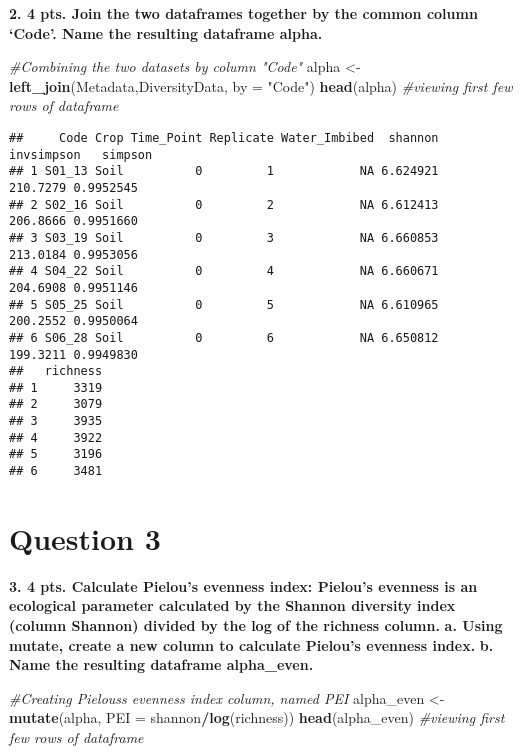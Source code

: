 \documentclass[
]{article}
\newenvironment{Shaded}{\begin{snugshade}}{\end{snugshade}}
\newcommand{\AttributeTok}[1]{\textcolor[rgb]{0.13,0.29,0.53}{#1}}
\newcommand{\CommentTok}[1]{\textcolor[rgb]{0.56,0.35,0.01}{\textit{#1}}}
\newcommand{\FunctionTok}[1]{\textcolor[rgb]{0.13,0.29,0.53}{\textbf{#1}}}
\newcommand{\NormalTok}[1]{#1}
\newcommand{\OtherTok}[1]{\textcolor[rgb]{0.56,0.35,0.01}{#1}}
\newcommand{\SpecialCharTok}[1]{\textcolor[rgb]{0.81,0.36,0.00}{\textbf{#1}}}
\newcommand{\StringTok}[1]{\textcolor[rgb]{0.31,0.60,0.02}{#1}}
\begin{document}
\textbf{2. 4 pts. Join the two dataframes together by the common column
`Code'. Name the resulting dataframe alpha.}

\begin{Shaded}
\begin{Highlighting}[]
\CommentTok{\#Combining the two datasets by column "Code"}
\NormalTok{alpha }\OtherTok{\textless{}{-}} \FunctionTok{left\_join}\NormalTok{(Metadata,DiversityData, }\AttributeTok{by =} \StringTok{"Code"}\NormalTok{)}
\FunctionTok{head}\NormalTok{(alpha) }\CommentTok{\#viewing first few rows of dataframe}
\end{Highlighting}
\end{Shaded}

\begin{verbatim}
##     Code Crop Time_Point Replicate Water_Imbibed  shannon invsimpson   simpson
## 1 S01_13 Soil          0         1            NA 6.624921   210.7279 0.9952545
## 2 S02_16 Soil          0         2            NA 6.612413   206.8666 0.9951660
## 3 S03_19 Soil          0         3            NA 6.660853   213.0184 0.9953056
## 4 S04_22 Soil          0         4            NA 6.660671   204.6908 0.9951146
## 5 S05_25 Soil          0         5            NA 6.610965   200.2552 0.9950064
## 6 S06_28 Soil          0         6            NA 6.650812   199.3211 0.9949830
##   richness
## 1     3319
## 2     3079
## 3     3935
## 4     3922
## 5     3196
## 6     3481
\end{verbatim}

\section{Question 3}\label{question-3}

\textbf{3. 4 pts. Calculate Pielou's evenness index: Pielou's evenness
is an ecological parameter calculated by the Shannon diversity index
(column Shannon) divided by the log of the richness column.} \textbf{a.
Using mutate, create a new column to calculate Pielou's evenness index.}
\textbf{b. Name the resulting dataframe alpha\_even.}

\begin{Shaded}
\begin{Highlighting}[]
\CommentTok{\#Creating Pielous\textquotesingle{}s evenness index column, named PEI}
\NormalTok{alpha\_even }\OtherTok{\textless{}{-}} \FunctionTok{mutate}\NormalTok{(alpha, }\AttributeTok{PEI =}\NormalTok{ shannon}\SpecialCharTok{/}\FunctionTok{log}\NormalTok{(richness))}
\FunctionTok{head}\NormalTok{(alpha\_even) }\CommentTok{\#viewing first few rows of dataframe}
\end{Highlighting}
\end{Shaded}
\end{document}
